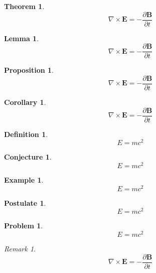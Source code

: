\documentclass[english,oneside, article]{memoir}
\theoremstyle{plain}
\newtheorem{Theorem}{Theorem}[chapter]
\newtheorem*{Lemma}{Lemma}
\newtheorem*{Proposition}{Proposition}
\newtheorem*{Corollary}{Corollary}
\theoremstyle{definition}
\newtheorem{Definition}{Definition}[chapter]
\newtheorem{Conjecture}{Conjecture}[chapter]
\newtheorem{Example}{Example}[chapter]
\newtheorem{Postulate}{Postulate}[chapter]
\newtheorem{Problem}{Problem}[chapter]
\theoremstyle{remark}
\newtheorem*{Remark}{Remark}
\begin{document}
\begin{Theorem}

\[\nabla \times \mathbf{E} = - \frac{\partial \mathbf{B}}{\partial t}\]

\end{Theorem}

\begin{Lemma}

\[\nabla \times \mathbf{E} = - \frac{\partial \mathbf{B}}{\partial t}\]

\end{Lemma}

\begin{Proposition}

\[\nabla \times \mathbf{E} = - \frac{\partial \mathbf{B}}{\partial t}\]

\end{Proposition}

\begin{Corollary}

\[\nabla \times \mathbf{E} = - \frac{\partial \mathbf{B}}{\partial t}\]

\end{Corollary}

\begin{Definition}

\[E=mc^2\]

\end{Definition}

\begin{Conjecture}

\[E=mc^2\]

\end{Conjecture}

\begin{Example}

\[E=mc^2\]

\end{Example}

\begin{Postulate}

\[E=mc^2\]

\end{Postulate}

\begin{Problem}

\[E=mc^2\]

\end{Problem}

\begin{Remark}

\[\nabla \times \mathbf{E} = - \frac{\partial \mathbf{B}}{\partial t}\]

\end{Remark}
\end{document}
